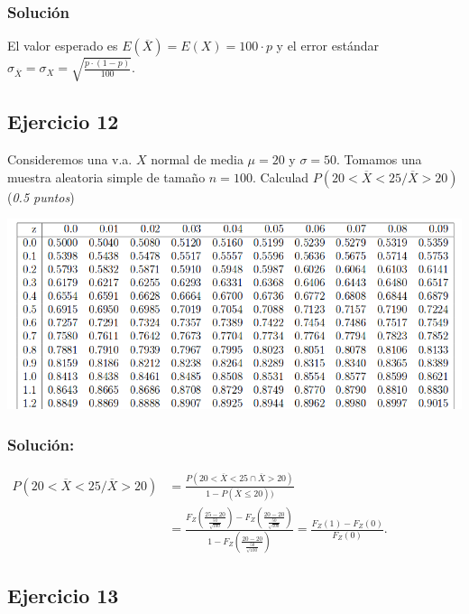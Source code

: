 \documentclass[]{article}
\begin{document}
\hypertarget{soluciuxf3n-10}{%
\subsubsection{Solución}\label{soluciuxf3n-10}}

El valor esperado es \(E(\overline{X}) =E(X)= 100\cdot p\) y el error
estándar
\(\sigma_{\overline{X}} =\sigma_{X}=\sqrt{\frac{p\cdot(1-p)}{100}}.\)

\hypertarget{ejercicio-12}{%
\subsection{Ejercicio 12}\label{ejercicio-12}}

Consideremos una v.a. \(X\) normal de media \(\mu=20\) y \(\sigma=50\).
Tomamos una muestra aleatoria simple de tamaño \(n=100\). Calculad
\(P(20< \overline{X}<25 /\overline{X}>20)\) (\emph{0.5 puntos})

\includegraphics{normal1examen.jpg}

\hypertarget{soluciuxf3n-11}{%
\subsubsection{Solución:}\label{soluciuxf3n-11}}

\(\begin{aligned} P(20< \overline{X}<25 /\overline{X}>20)&=\frac{P(20< \overline{X}<25\cap \overline{X}>20)}{1-P( \overline{X}\leq 20))}\\ &=\frac{F_Z\left(\frac{25-20}{\frac{50}{\sqrt{100}}}\right)-F_Z\left(\frac{20-20}{\frac{50}{\sqrt{100}}}\right)}{1-F_Z\left(\frac{20-20}{\frac{50}{\sqrt{100}}}\right)}= \frac{F_Z(1)-F_Z(0)}{F_Z(0)}. \end{aligned}\)

\hypertarget{ejercicio-13}{%
\subsection{Ejercicio 13}\label{ejercicio-13}}
\end{document}
